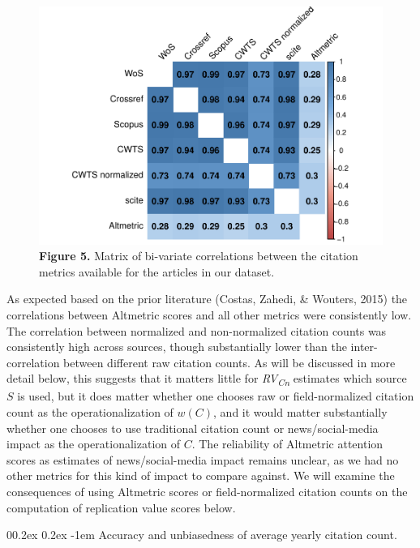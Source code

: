 \documentclass[
  man,floatsintext]{apa6}
\makeatletter
\let\oldparagraph\paragraph
\renewcommand{\paragraph}[1]{\oldparagraph{#1}\mbox{}}
\renewcommand{\paragraph}{\@startsection{paragraph}{4}{\parindent}%
  {0\baselineskip \@plus 0.2ex \@minus 0.2ex}%
  {-1em}%
  {\normalfont\normalsize\bfseries\itshape\typesectitle}}
\makeatother
\begin{document}
\begin{figure}
\centering
\includegraphics{RVcn_feasibility_in_social_neuroscience_cortex_files/figure-latex/fig5-1.pdf}
\caption{\label{fig:fig5}\textbf{Figure 5.} Matrix of bi-variate correlations between the citation metrics available for the articles in our dataset.}
\end{figure}

As expected based on the prior literature (Costas, Zahedi, \& Wouters, 2015) the correlations between Altmetric scores and all other metrics were consistently low. The correlation between normalized and non-normalized citation counts was consistently high across sources, though substantially lower than the inter-correlation between different raw citation counts. As will be discussed in more detail below, this suggests that it matters little for \emph{RV\textsubscript{Cn}} estimates which source \(S\) is used, but it does matter whether one chooses raw or field-normalized citation count as the operationalization of \(w(C)\), and it would matter substantially whether one chooses to use traditional citation count or news/social-media impact as the operationalization of \(C\). The reliability of Altmetric attention scores as estimates of news/social-media impact remains unclear, as we had no other metrics for this kind of impact to compare against. We will examine the consequences of using Altmetric scores or field-normalized citation counts on the computation of replication value scores below.

\hypertarget{accuracy-and-unbiasedness-of-average-yearly-citation-count.}{%
\paragraph{Accuracy and unbiasedness of average yearly citation count.}\label{accuracy-and-unbiasedness-of-average-yearly-citation-count.}}
\end{document}
